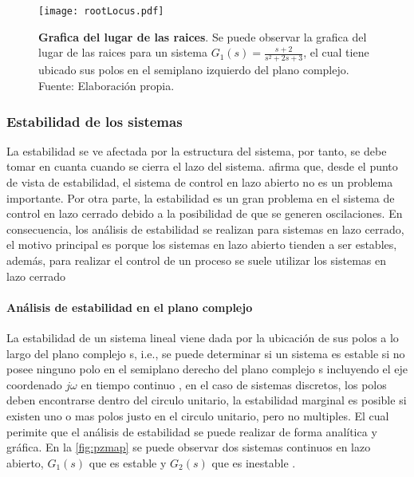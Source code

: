             \begin{figure}[htb]
                \centering
                \texttt{[image: rootLocus.pdf]}
                \caption[Ejemplo de grafica del lugar de las raices]{\textbf{Grafica del lugar de las raices}. Se puede observar la grafica del lugar de las raices para un sistema $G_1(s) = \frac{s + 2}{s^2 + 2s + 3}$, el cual tiene ubicado sus polos en el semiplano izquierdo del plano complejo. Fuente: Elaboración propia.} 
                \label{fig:rootLocus}
            \end{figure}

        \subsubsection{Estabilidad de los sistemas}

            La estabilidad se ve afectada por la estructura del sistema, por tanto, se debe tomar en cuanta cuando se cierra el lazo del sistema. \textcite{ogata2003ingenieria} afirma que, desde el punto de vista de estabilidad, el sistema de control en lazo abierto no es un problema importante. Por otra parte, la estabilidad es un gran problema en el sistema de control en lazo cerrado debido a la posibilidad de que se generen oscilaciones. En consecuencia, los análisis de estabilidad se realizan para sistemas en lazo cerrado, el motivo principal es porque los sistemas en lazo abierto tienden a ser estables, además, para realizar el control de un proceso se suele utilizar los sistemas en lazo cerrado

            \paragraph{Análisis de estabilidad en el plano complejo}
            
                La estabilidad de un sistema lineal viene dada por la ubicación de sus polos a lo largo del plano complejo s, i.e., se puede determinar si un sistema es estable si no posee ninguno polo en el semiplano derecho del plano complejo s incluyendo el eje coordenado $j\omega$ en tiempo continuo \Parencite{ogata2003ingenieria}, en el caso de sistemas discretos, los polos deben encontrarse dentro del circulo unitario, la estabilidad marginal es posible si existen uno o mas polos justo en el circulo unitario, pero no multiples. El cual perimite que el análisis de estabilidad se puede realizar de forma analítica y gráfica. En la \cref{fig:pzmap} se puede observar dos sistemas continuos en lazo abierto, $G_1(s)$ que es estable y $G_2(s)$ que es inestable .

